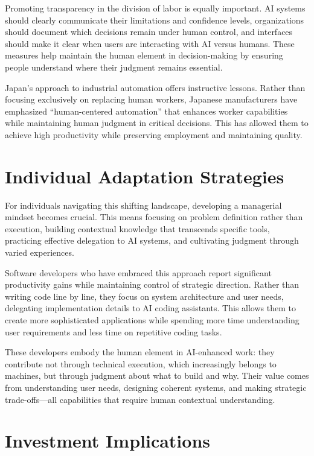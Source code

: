 \documentclass[
  Letterpaper,
]{scrbook}
\begin{document}
Promoting transparency in the division of labor is equally important. AI
systems should clearly communicate their limitations and confidence
levels, organizations should document which decisions remain under human
control, and interfaces should make it clear when users are interacting
with AI versus humans. These measures help maintain the human element in
decision-making by ensuring people understand where their judgment
remains essential.

Japan's approach to industrial automation offers instructive lessons.
Rather than focusing exclusively on replacing human workers, Japanese
manufacturers have emphasized ``human-centered automation'' that
enhances worker capabilities while maintaining human judgment in
critical decisions. This has allowed them to achieve high productivity
while preserving employment and maintaining quality.

\section{Individual Adaptation
Strategies}\label{individual-adaptation-strategies}

For individuals navigating this shifting landscape, developing a
managerial mindset becomes crucial. This means focusing on problem
definition rather than execution, building contextual knowledge that
transcends specific tools, practicing effective delegation to AI
systems, and cultivating judgment through varied experiences.

Software developers who have embraced this approach report significant
productivity gains while maintaining control of strategic direction.
Rather than writing code line by line, they focus on system architecture
and user needs, delegating implementation details to AI coding
assistants. This allows them to create more sophisticated applications
while spending more time understanding user requirements and less time
on repetitive coding tasks.

These developers embody the human element in AI-enhanced work: they
contribute not through technical execution, which increasingly belongs
to machines, but through judgment about what to build and why. Their
value comes from understanding user needs, designing coherent systems,
and making strategic trade-offs---all capabilities that require human
contextual understanding.

\section{Investment Implications}\label{investment-implications-4}
\end{document}
